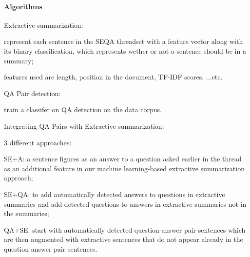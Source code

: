 \documentclass[12pt]{article}
\newenvironment{my_itemize}
{\begin{itemize}
  \setlength{\itemsep}{0cm}
  \setlength{\parskip}{0cm}}
{\end{itemize}}
\begin{document}
\paragraph{Algorithms}
\begin{my_itemize}
  \item Extractive summarization:
  \begin{my_itemize}
    \item represent each sentence in the SEQA threadset with a feature vector 
	  along with its binary classification, which represents wether or not a
	  sentence should be in a summary;
    \item features used are length, position in the document, TF-IDF scores, ...etc.
  \end{my_itemize}
  \item QA Pair detection:
  \begin{my_itemize}
    \item train a classifer on QA detection on the data corpus.
  \end{my_itemize}
  \item Integrating QA Pairs with Extractive summarization:
  \begin{my_itemize}
    \item 3 different approaches:
    \begin{my_itemize}
      \item SE+A: a sentence figures as an answer to a question asked earlier 
	    in the thread as an additional feature in our machine learning-based 
	    extractive summarization approach;
      \item SE+QA: to add automatically detected answers to questions in 
	    extractive summaries and add detected questions to answers in extractive 
	    summaries not in the summaries;
      \item QA+SE: start with automatically detected question-answer pair sentences 
	    which are then augmented with extractive sentences that do not 
	    appear already in the question-answer pair sentences.
    \end{my_itemize}
  \end{my_itemize}
\end{my_itemize}
\end{document}
